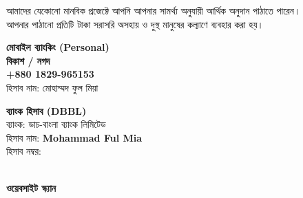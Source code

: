 \documentclass[11pt]{article}
\newcommand{\eng}[1]{{\engfont #1}}
\begin{document}
\begin{tcolorbox}
\begin{minipage}[t]{0.485\textwidth}
\begin{tcolorbox}
\begin{itemize}
            \end{itemize}
        \end{tcolorbox}
    \end{minipage}
\end{tcolorbox}

\vspace{-0.22cm}

\begin{tcolorbox}[
    enhanced,
    title=\textbf{ডোনেশন মাধ্যম ও ব্যাংক তথ্য (\eng{Donation Channels})},
    colback=softgray,
    colframe=navyblue,
    coltitle=white,
    colbacktitle=navyblue,
    arc=3mm,
    fonttitle=\large\bfseries\centering,
    attach boxed title to top center={yshift=-10pt, yshifttext=-1.5ex},
    boxed title style={colback=navyblue, arc=1.5mm, boxrule=0pt, left=15pt, right=15pt},
    top=12pt, bottom=10pt, left=12pt, right=12pt,
    shadow={1.5mm}{-1.5mm}{0mm}{black!5}
]
    \centering
    \fontsize{9.5}{12.5}\selectfont
    আমাদের যেকোনো মানবিক প্রজেক্টে আপনি আপনার সামর্থ্য অনুযায়ী আর্থিক অনুদান পাঠাতে পারেন। \\
    আপনার পাঠানো প্রতিটি টাকা সরাসরি অসহায় ও দুস্থ মানুষের কল্যাণে ব্যবহার করা হয়। \par
    \vspace{0.3cm}
    \begin{minipage}[t]{0.34\textwidth}
        \centering
        \vspace{0pt}
        \textbf{\color{navyblue}মোবাইল ব্যাংকিং (\eng{Personal})} \\[4pt]
        \textbf{\color{deepcyan}বিকাশ / নগদ} \\
        \fontsize{12}{14}\selectfont \textbf{\eng{+880 1829-965153}} \\[4pt]
        \fontsize{9}{11}\selectfont হিসাব নাম: মোহাম্মদ ফুল মিয়া
    \end{minipage}
    \hfill
    \color{navyblue!20}\vrule\color{black}
    \hfill
    \begin{minipage}[t]{0.38\textwidth}
        \centering
        \vspace{0pt}
        \textbf{\color{navyblue}ব্যাংক হিসাব (\eng{DBBL})} \\[4pt]
        ব্যাংক: ডাচ-বাংলা ব্যাংক লিমিটেড \\
        হিসাব নাম: \textbf{\eng{Mohammad Ful Mia}} \\
        হিসাব নম্বর: \textbf{\eng{2261510170962}}
    \end{minipage}
    \hfill
    \color{navyblue!20}\vrule\color{black}
    \hfill
    \begin{minipage}[t]{0.18\textwidth}
        \centering
        \vspace{0pt}
         \\[4pt]
        \fontsize{8}{10}\selectfont \textbf{\color{navyblue}ওয়েবসাইট স্ক্যান}
    \end{minipage}
\end{tcolorbox}
\end{document}
